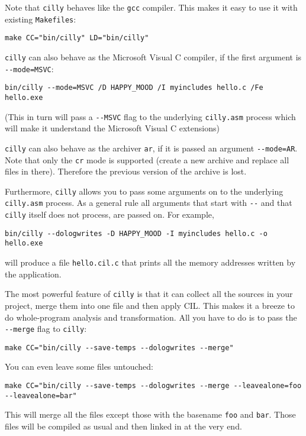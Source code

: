 \documentclass{article}
\def\t#1{{\tt #1}}
\begin{document}
 Note that \t{cilly} behaves like the \t{gcc} compiler. This makes it
easy to use it with existing \t{Makefiles}:
\begin{verbatim}
make CC="bin/cilly" LD="bin/cilly"
\end{verbatim}

 \t{cilly} can also behave as the Microsoft Visual C compiler, if the first
 argument is \t{-{}-mode=MSVC}:
\begin{verbatim}
bin/cilly --mode=MSVC /D HAPPY_MOOD /I myincludes hello.c /Fe hello.exe
\end{verbatim}

 (This in turn will pass a \t{-{}-MSVC} flag to the underlying \t{cilly.asm}
 process which will make it understand the Microsoft Visual C extensions)

 \t{cilly} can also behave as the archiver \t{ar}, if it is passed an
argument \t{-{}-mode=AR}. Note that only the \t{cr} mode is supported (create a
new archive and replace all files in there).  Therefore the previous version of
the archive is lost. 

 Furthermore, \t{cilly} allows you to pass some arguments on to the
underlying \t{cilly.asm} process. As a general rule all arguments that start
with \t{-{}-} and that \t{cilly} itself does not process, are passed on. For
example, 
\begin{verbatim}
bin/cilly --dologwrites -D HAPPY_MOOD -I myincludes hello.c -o hello.exe
\end{verbatim}

 will produce a file \t{hello.cil.c} that prints all the memory addresses
written by the application. 

 The most powerful feature of \t{cilly} is that it can collect all the
sources in your project, merge them into one file and then apply CIL. This
makes it a breeze to do whole-program analysis and transformation. All you
have to do is to pass the \t{-{}-merge} flag to \t{cilly}:
\begin{verbatim}
make CC="bin/cilly --save-temps --dologwrites --merge"
\end{verbatim}

 You can even leave some files untouched:
\begin{verbatim}
make CC="bin/cilly --save-temps --dologwrites --merge --leavealone=foo --leavealone=bar"
\end{verbatim}

 This will merge all the files except those with the basename \t{foo} and
\t{bar}. Those files will be compiled as usual and then linked in at the very
end. 
\end{document}
